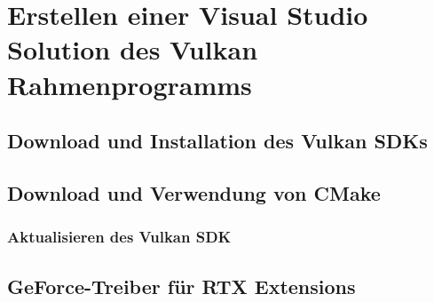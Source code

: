 \chapter{Erstellen einer Visual Studio Solution des Vulkan Rahmenprogramms}


\section{Download und Installation des Vulkan SDKs}


\section{Download und Verwendung von CMake}


\subsection{Aktualisieren des Vulkan SDK}


\section{GeForce-Treiber für RTX Extensions}
